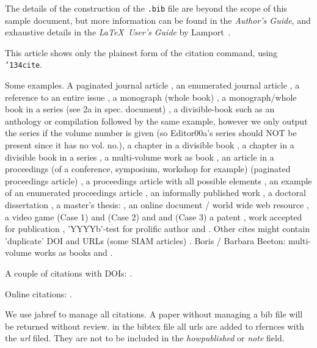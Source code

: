 \documentclass[sigconf]{acmart}
\begin{document}
The details of the construction of the \texttt{.bib} file are beyond
the scope of this sample document, but more information can be found
in the \textit{Author's Guide}, and exhaustive details in the
\textit{\LaTeX\ User's Guide} by Lamport~.

This article shows only the plainest form of the citation command,
using \texttt{{\char'134}cite}.

Some examples.  A paginated journal article \cite{Abril07}, an
enumerated journal article \cite{Cohen07}, a reference to an entire
issue \cite{JCohen96}, a monograph (whole book) \cite{Kosiur01}, a
monograph/whole book in a series (see 2a in spec. document)
\cite{Harel79}, a divisible-book such as an anthology or compilation
\cite{Editor00} followed by the same example, however we only output
the series if the volume number is given \cite{Editor00a} (so
Editor00a's series should NOT be present since it has no vol. no.), a
chapter in a divisible book \cite{Spector90}, a chapter in a divisible
book in a series \cite{Douglass98}, a multi-volume work as book
\cite{Knuth97}, an article in a proceedings (of a conference,
symposium, workshop for example) (paginated proceedings article)
\cite{Andler79}, a proceedings article with all possible elements
\cite{Smith10}, an example of an enumerated proceedings article
\cite{VanGundy07}, an informally published work \cite{Harel78}, a
doctoral dissertation \cite{Clarkson85}, a master's thesis:
\cite{anisi03}, an online document / world wide web resource
\cite{Thornburg01, Ablamowicz07, Poker06}, a video game (Case 1)
\cite{Obama08} and (Case 2) \cite{Novak03} and \cite{Lee05} and (Case
3) a patent \cite{JoeScientist001}, work accepted for publication
\cite{rous08}, 'YYYYb'-test for prolific author \cite{SaeediMEJ10} and
\cite{SaeediJETC10}. Other cites might contain 'duplicate' DOI and
URLs (some SIAM articles) \cite{Kirschmer:2010:AEI:1958016.1958018}.
Boris / Barbara Beeton: multi-volume works as books \cite{MR781536}
and \cite{MR781537}.

A couple of citations with DOIs: \cite{2004:ITE:1009386.1010128,
  Kirschmer:2010:AEI:1958016.1958018}.

Online citations: \cite{TUGInstmem, Thornburg01, CTANacmart}.  

We use jabref to manage all citations. A paper without managing a bib
file will be returned without review. in the bibtex file all urls are
added to rfernces with the {\it url} filed. They are not to be
included in the {\it howpublished} or {\it note} field. 
\end{document}
